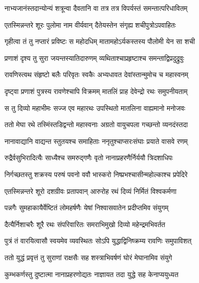 \twolineshloka
{नाभ्यजानंस्तदान्योन्यं शत्रून्वा दैवतानि वा}
{तत्र तत्र विपर्यस्तं समन्तात्परिधावितम्} %

\twolineshloka
{एतस्मिन्नन्तरे शूरः पुलोमा नाम वीर्यवान्}
{दैतेयस्तेन संगृह्य शचीपुत्रोऽपवाहितः} %

\twolineshloka
{गृहीत्वा तं तु नप्तारं प्रविष्टः स महोदधिम्}
{मातामहोऽर्यकस्तस्य पौलोमी येन सा शची} %

\twolineshloka
{प्रणाशं दृश्य तु सुरा जयन्तस्यातिदारुणम्}
{व्यथिताश्चाप्रहृष्टाश्च समन्ताद्विप्रदुद्रुवुः} %

\twolineshloka
{रावणिस्त्वथ संहृष्टो बलैः परिवृतः स्वकैः}
{अभ्यधावत देवांस्तान्मुमोच च महास्वनम्} %

\twolineshloka
{दृष्ट्वा प्रणाशं पुत्रस्य रावणेश्चापि विक्रमम्}
{मातलिं प्राह देवेन्द्रो रथः समुपनीयताम्} %

\twolineshloka
{स तु दिव्यो महाभीमः सज्ज एव महारथः}
{उपस्थितो मातलिना वाह्यमानो मनोजवः} %

\twolineshloka
{ततो मेघा रथे तस्मिंस्तडिद्वन्तो महास्वनाः}
{अग्रतो वायुचपला गच्छन्तो व्यनदंस्तदा} %

\twolineshloka
{नानावाद्यानि वाद्यन्त स्तुतयश्च समाहिताः}
{ननृतुश्चाप्सरःसंघाः प्रयाते वासवे रणम्} %

\twolineshloka
{रुद्रैर्वसुभिरादित्यैः साध्यैश्च समरुद्गणैः}
{वृतो नानाप्रहरणैर्निर्ययौ त्रिदशाधिपः} %

\twolineshloka
{निर्गच्छतस्तु शक्रस्य परुषं पवनो ववौ}
{भास्करो निष्प्रभश्चासीन्महोल्काश्च प्रपेदिरे} %

\twolineshloka
{एतस्मिन्नन्तरे शूरो दशग्रीवः प्रतापवान्}
{आरुरोह रथं दिव्यं निर्मितं विश्वकर्मणा} %

\twolineshloka
{पन्नगैः सुमहाकायैर्वेष्टितं लोमहर्षणैः}
{येषां निश्वासवातेन प्रदीप्तमिव संयुगम्} %

\twolineshloka
{दैत्यैर्निशाचरैः शूरै रथः संपरिवारितः}
{समराभिमुखो दिव्यो महेन्द्रमभिवर्तत} %

\twolineshloka
{पुत्रं तं वारयित्वासौ स्वयमेव व्यवस्थितः}
{सोऽपि युद्धाद्विनिष्क्रम्य रावणिः समुपाविशत्} %

\twolineshloka
{ततो युद्धं प्रवृत्तं तु सुराणां राक्षसैः सह}
{शस्त्राभिवर्षणं घोरं मेघानामिव संयुगे} %

\twolineshloka
{कुम्भकर्णस्तु दुष्टात्मा नानाप्रहरणोद्यतः}
{नाज्ञायत तदा युद्धे सह केनाप्ययुध्यत} %

